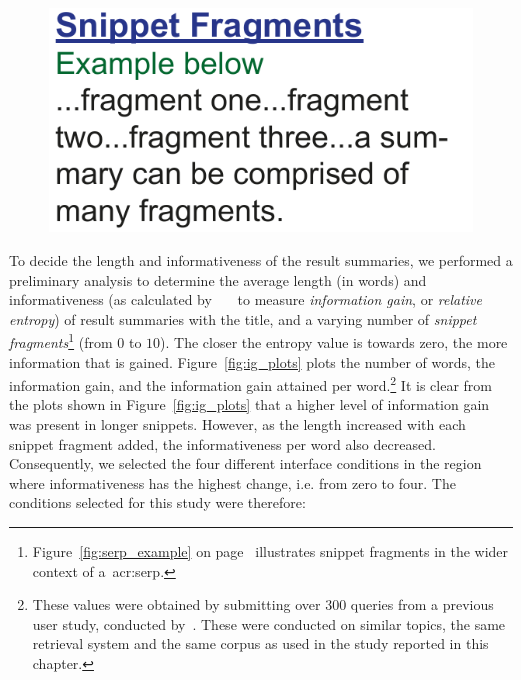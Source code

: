 \begin{figure}
    \begin{center}
    \vspace*{-6mm}
    \includegraphics[width=1\textwidth]{figures/ch7-fragments.pdf}
    \end{center}
    \vspace*{-4mm}
    \label{fig:fragments}
\end{figure}

To decide the length and informativeness of the result summaries, we performed a preliminary analysis to determine the average length (in words) and informativeness (as calculated by~~\citep{kullback1951information}~\citep{kullback1951information} to measure \emph{information gain}, or \emph{relative entropy}) of result summaries with the title, and a varying number of \emph{snippet fragments}\footnote{Figure~\ref{fig:serp_example} on page~\pageref{fig:serp_example} illustrates snippet fragments in the wider context of a~\gls{acr:serp}.} (from $0$ to $10$). The closer the entropy value is towards zero, the more information that is gained. Figure~\ref{fig:ig_plots} plots the number of words, the information gain, and the information gain attained per word.\footnote{These values were obtained by submitting over $300$ queries from a previous user study, conducted by~\cite{azzopardi2013query_cost}. These were conducted on similar topics, the same retrieval system and the same corpus as used in the study reported in this chapter.} It is clear from the plots shown in Figure~\ref{fig:ig_plots} that a higher level of information gain was present in longer snippets. However, as the length increased with each snippet fragment added, the informativeness per word also decreased. Consequently, we selected the four different interface conditions in the region where informativeness has the highest change, i.e. from zero to four. The conditions selected for this study were therefore:

